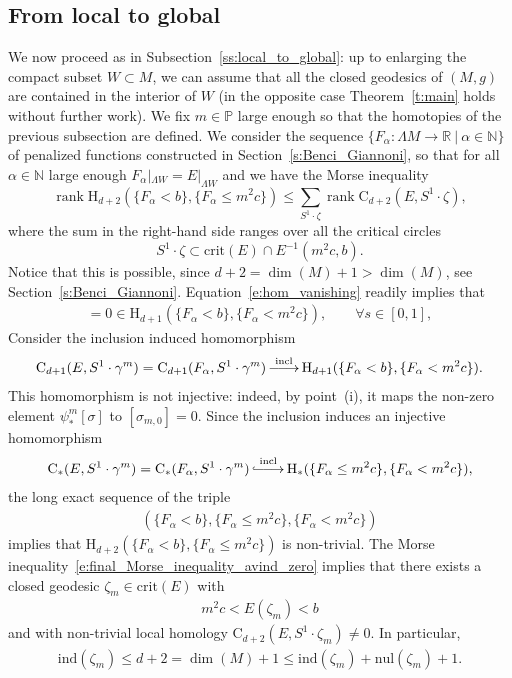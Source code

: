 \documentclass[reqno]{amsart}
\numberwithin{equation}{section}
\theoremstyle{personal}%
\theoremstyle{definition}
\newcommand{\N}{\mathds{N}}
\newcommand{\R}{\mathds{R}}
\newcommand{\PP}{\mathds{P}}
\newcommand{\incl}{\mathrm{incl}}
\newcommand{\crit}{\mathrm{crit}}
\newcommand{\Hom}{\mathrm{H}}
\newcommand{\Loc}{\mathrm{C}}
\newcommand{\ind}{\mathrm{ind}}
\newcommand{\nul}{\mathrm{nul}}
\DeclareRobustCommand{\llonghookrightarrow}{\lhook\joinrel\relbar\joinrel\relbar\joinrel\rightarrow}
\DeclareRobustCommand{\llongrightarrow}{\relbar\joinrel\relbar\joinrel\rightarrow}
\DeclareMathOperator{\rank}{\mathrm{rank}}
\DeclareMathOperator*{\ttoup}{\llongrightarrow}
\DeclareMathOperator*{\eembup}{\llonghookrightarrow}
\begin{document}
\subsection{From local to global}
We now proceed as in Subsection~\ref{ss:local_to_global}: up to enlarging the compact subset $W\subset M$, we can assume that all the closed geodesics of $(M,g)$ are contained in the interior of $W$ (in the opposite case Theorem~\ref{t:main} holds without further work). We fix $m\in\PP$ large enough so that the homotopies of the previous subsection are defined. We consider the sequence  $\{F_\alpha:\Lambda M\to\R\ |\ \alpha\in\N\}$ of penalized functions constructed in Section~\ref{s:Benci_Giannoni}, so that for all $\alpha\in\N$ large enough $F_\alpha|_{\Lambda W}=E|_{\Lambda W}$ and we have the Morse inequality
\begin{equation}
\label{e:final_Morse_inequality_avind_zero}
\rank \Hom_{d+2}(\{F_\alpha<b\},\{F_\alpha\leq m^2c\})
\leq 
\sum_{S^1\cdot\zeta} \rank\Loc_{d+2}(E,S^1\cdot\zeta),
\end{equation}
where the sum in the right-hand side ranges over all the critical circles 
\[S^1\cdot\zeta\subset\crit(E)\cap E^{-1}(m^2c,b).\]
Notice that this is possible, since $d+2=\dim(M)+1>\dim(M)$, see Section~\ref{s:Benci_Giannoni}.
Equation~\eqref{e:hom_vanishing} readily implies that
\begin{align*}
[\sigma_{m,s}]=0\in\Hom_{d+1}(\{F_\alpha<b\},\{F_\alpha<m^2c\}),
\qquad\forall s\in[0,1], 
\end{align*}
Consider the inclusion induced homomorphism 
\begin{align*}
\Loc_{d+1}(E,S^1\cdot\gamma^m)=\Loc_{d+1}(F_\alpha,S^1\cdot\gamma^m) \ttoup^{\incl} \Hom_{d+1}(\{F_\alpha<b\},\{F_\alpha<m^2c\}).
\end{align*}
This homomorphism is not injective: indeed, by point~(i), it maps the non-zero element $\psi^m_*[\sigma]$ to $[\sigma_{m,0}]=0$. Since the inclusion induces an injective homomorphism
\begin{align*}
\Loc_*(E,S^1\cdot\gamma^m)=\Loc_*(F_\alpha,S^1\cdot\gamma^m) \eembup^{\incl} \Hom_*(\{F_\alpha\leq m^2c\},\{F_\alpha<m^2c\}),
\end{align*}
the long exact sequence of the triple
\begin{align*}
(\{F_\alpha<b\},\{F_\alpha\leq m^2c\},\{F_\alpha<m^2c\})
\end{align*}
implies that $\Hom_{d+2}(\{F_\alpha<b\},\{F_\alpha\leq m^2c\})$ is non-trivial. The Morse inequality~\eqref{e:final_Morse_inequality_avind_zero} implies that there exists a closed geodesic $\zeta_m\in\crit(E)$ with 
\begin{align}\label{e:avindzero_energy_bounds}
m^2c<E(\zeta_m)<b 
\end{align}
and with non-trivial local homology $\Loc_{d+2}(E,S^1\cdot\zeta_m)\neq0$. In particular, 
\begin{align}\label{e:avindzero_index_bounds}
\ind(\zeta_m)\leq d+2=\dim(M)+1\leq \ind(\zeta_m)+\nul(\zeta_m)+1.
\end{align}
\end{document}
